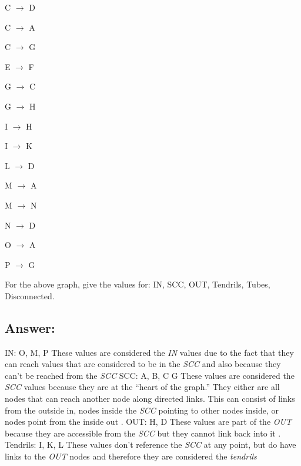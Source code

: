 \documentclass[a4paper, 11pt]{article}
\begin{document}
    C $\longrightarrow$ D
    
    C $\longrightarrow$ A
    
    C $\longrightarrow$ G
    
    E $\longrightarrow$ F
    
    G $\longrightarrow$ C
    
    G $\longrightarrow$ H
    
    I $\longrightarrow$ H
    
    I $\longrightarrow$ K
    
    L $\longrightarrow$ D
    
    M $\longrightarrow$ A
    
    M $\longrightarrow$ N
    
    N $\longrightarrow$ D
    
    O $\longrightarrow$ A
    
    P $\longrightarrow$ G 
    
    For the above graph, give the values for: IN, SCC, OUT, Tendrils, Tubes, Disconnected.
\subsection*{Answer:}
IN: O, M, P
\newline
These values are considered the \emph{IN} values due to the fact that they can reach values that are considered to be in the \emph{SCC} and also because they can't be reached from the \emph{SCC}
\noindent
\newline
SCC: A, B, C G
\newline
These values are considered the \emph{SCC} values because they are at the ``heart of the graph.'' They either are all nodes that can reach another node along directed links. This can consist of links from the outside in, nodes inside the \emph{SCC} pointing to other nodes inside, or nodes point from the inside out .
\noindent
\newline
OUT: H, D
\newline
These values are part of the \emph{OUT} because they are accessible from the \emph{SCC} but they cannot link back into it .
\noindent
\newline
Tendrils: I, K, L
\newline
These values don't reference the \emph{SCC} at any point, but do have links to the \emph{OUT} nodes and therefore they are considered the \emph{tendrils}
\end{document}
